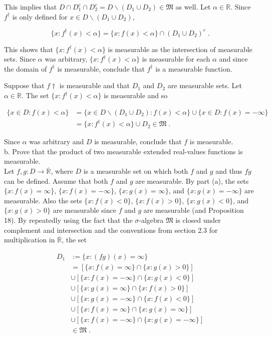 \documentclass[a4paper]{article}
\begin{document}
This implies that $D\cap D_1^c\cap D_2^c = D \backslash (D_1\cup D_2)\in \mathfrak{M}$ as well. Let $\alpha \in \mathbb{R}$. Since $f^\dagger$ is only defined for $x \in D\backslash (D_1 \cup D_2)$,

$$\{x: f^\dagger(x) < \alpha\} = \{x: f(x) < \alpha\} \cap (D_1\cup D_2)^c \;.$$

This shows that $\{x : f^\dagger(x) < \alpha\}$ is measurable as the intersection of measurable sets. Since $\alpha$ was arbitrary, $\{x : f^\dagger(x) < \alpha\}$ is measurable for each $\alpha$ and since the domain of $f^\dagger$ is measurable, conclude that $f^\dagger$ is a measurable function. 

Suppose that $f\dagger$ is measurable and that $D_1$ and $D_2$ are measurable sets. Let $\alpha \in \mathbb{R}$. The set $\{x : f^\dagger(x) < \alpha\}$ is measurable and so

\begin{align*}
\{x \in D : f(x) < \alpha \} &= \{x \in D\backslash (D_1 \cup D_2) : f(x) < \alpha \} \cup \{x \in D : f(x) = -\infty \}\\
&= \{x : f^\dagger(x) < \alpha\}\cup D_2 \in \mathfrak{M} \;.
\end{align*}

Since $\alpha$ was arbitrary and $D$ is measurable, conclude that $f$ is measurable.\\

b. Prove that the product of two measurable extended real-values functions is measurable. \\

Let $f,g : D \rightarrow \overline{\mathbb{R}}$, where $D$ is a measurable set on which both $f$ and $g$ and thus $fg$ can be defined. Assume that both $f$ and $g$ are measurable. By part (a), the sets $\{x : f(x) = \infty\}$, $\{x : f(x) = -\infty\}$, $\{x : g(x) = \infty\}$, and $\{x : g(x) = -\infty\}$ are measurable. Also the sets $\{x : f(x) < 0\}$, $\{x : f(x) > 0\}$, $\{x : g(x)  < 0\}$, and $\{x : g(x)  > 0\}$ are measurable since $f$ and $g$ are measurable (and Proposition 18). By repeatedly using the fact that the $\sigma$-algebra $\mathfrak{M}$ is closed under complement and intersection and the conventions from section 2.3 for multiplication in $\overline{\mathbb{R}}$, the set


\begin{align*}
D_1 &:= \{x : (fg)(x) = \infty\}\\
&=[\{x : f(x) = \infty\} \cap \{x : g(x) > 0\}]\\
&\cup [\{x : f(x) = -\infty\} \cap \{x : g(x) < 0\}]\\
&\cup [\{x : g(x) = \infty\} \cap \{x : f(x) > 0\}]\\
&\cup [\{x : g(x) = -\infty\} \cap \{x : f(x) < 0\}]\\
&\cup [\{x : f(x) = \infty\} \cap \{x : g(x) = \infty\}]\\
&\cup [\{x : f(x) = -\infty\} \cap \{x : g(x) = -\infty\}]\\
& \in \mathfrak{M} \;.
\end{align*}
\end{document}
